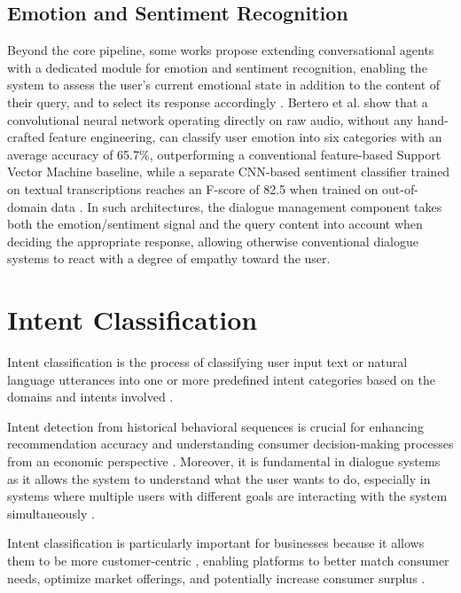 \documentclass[12pt,a4paper,openright,twoside]{book}
\begin{document}
\subsection{Emotion and Sentiment Recognition}
Beyond the core pipeline, some works propose extending conversational agents with a dedicated module for emotion and sentiment recognition,
enabling the system to assess the user's current emotional state in addition to the content of their query, and to select its response accordingly \cite{bertero2016real}.
Bertero et al. show that a convolutional neural network operating directly on raw audio, without any hand-crafted feature engineering,
can classify user emotion into six categories with an average accuracy of 65.7\%, outperforming a conventional feature-based Support Vector Machine baseline,
while a separate CNN-based sentiment classifier trained on textual transcriptions reaches an F-score of 82.5 when trained on out-of-domain data \cite{bertero2016real}.
In such architectures, the dialogue management component takes both the emotion/sentiment signal and the query content into account when deciding the appropriate response,
allowing otherwise conventional dialogue systems to react with a degree of empathy toward the user.

\section{Intent Classification}

Intent classification is the process of classifying user input text
or natural language utterances into one or more predefined intent
categories based on the domains and intents involved \cite{celikyilmaz2011exploiting, al2022intent}.

Intent detection from historical behavioral sequences is crucial for
enhancing recommendation accuracy and understanding consumer decision-making
processes from an economic perspective \cite{jin2025hicore}.
Moreover, it is fundamental in dialogue systems as it allows the system
to understand what the user wants to do, especially in systems where multiple
users with different goals are interacting with the system simultaneously \cite{al2022intent}.

Intent classification is particularly important for businesses because it
allows them to be more customer-centric \cite{al2022intent}, enabling platforms
to better match consumer needs, optimize market offerings, and potentially
increase consumer surplus \cite{jin2025hicore}.
\end{document}
